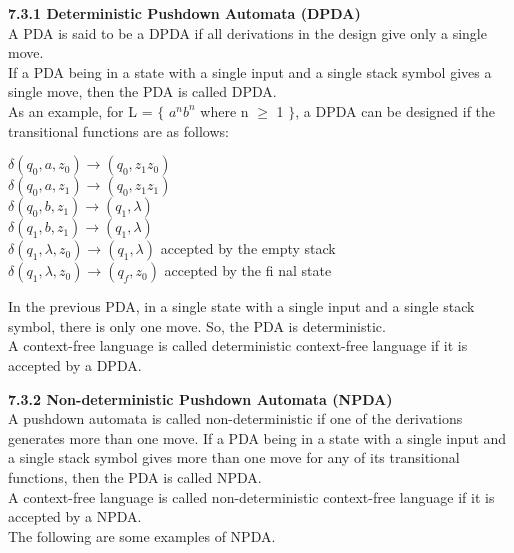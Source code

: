\documentclass{article}
\begin{document}
	\begin{flushleft}
		\textbf{7.3.1 Deterministic Pushdown Automata (DPDA)}\\
		A PDA is said to be a DPDA if all derivations in the design give only a single move.\\
		If a PDA being in a state with a single input and a single stack symbol gives a single move, then the
		PDA is called DPDA.\\
		As an example, for L = $\lbrace$ $a^{n}b^{n}$ where n $\geq$ 1 $\rbrace$, a DPDA can be designed if the transitional functions are
		as follows:
	\end{flushleft}
\begin{center}
	\hspace{4mm}$\delta$$(q_0,a,z_0)\xrightarrow{}(q_0,z_1z_0)$\\
	\hspace{4mm}$\delta$$(q_0,a,z_1)\xrightarrow{}(q_0,z_1z_1)$\\
	$\delta$$(q_0,b,z_1)\xrightarrow{}(q_1,\lambda)$\\
	$\delta$$(q_1,b,z_1)\xrightarrow{}(q_1,\lambda)$\\
	\hspace{4.4cm}$\delta$$(q_1,\lambda,z_0)\xrightarrow{}(q_1,\lambda)$ accepted by the empty stack\\
	\hspace{4.4cm}$\delta$$(q_1,\lambda,z_0)\xrightarrow{}(q_f,z_0)$ accepted by the fi nal state\\
\end{center}
\begin{center}
	In the previous PDA, in a single state with a single input and a single stack symbol, there is only one
	move. So, the PDA is deterministic.\\
	A context-free language is called deterministic context-free language if it is accepted by a DPDA.
\end{center}
\begin{flushleft}
	\textbf{7.3.2 Non-deterministic Pushdown Automata (NPDA)}\\
	A pushdown automata is called non-deterministic if one of the derivations generates more than one move.
	If a PDA being in a state with a single input and a single stack symbol gives more than one move for
	any of its transitional functions, then the PDA is called NPDA.\\
	A context-free language is called non-deterministic context-free language if it is accepted by a NPDA.\\
	The following are some examples of NPDA.
\end{flushleft}
\end{document}
